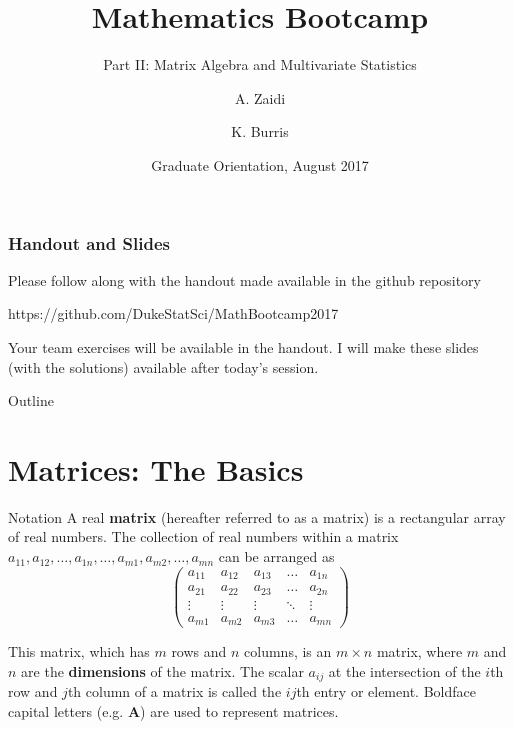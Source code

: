 \documentclass{beamer}
\title{Mathematics Bootcamp}
\subtitle{Part II: Matrix Algebra and Multivariate Statistics}
\author{A. Zaidi\inst{1} \and K. Burris\inst{1}}
\institute[Duke University] %
{
  \inst{1}%
  Department of Statistical Science\\
  Duke University
  }
\date{Graduate Orientation, August 2017}
\begin{document}
\begin{frame}
  \titlepage
\end{frame}

\begin{frame}
\frametitle{Handout and Slides}

Please follow along with the handout made available in the github repository

\begin{center}
https://github.com/DukeStatSci/MathBootcamp2017
\end{center} 

Your team exercises will be available in the handout.  I will make these slides (with the solutions) available after today's session.
\end{frame}

\begin{frame}{Outline}
  \tableofcontents
\end{frame}

\section{Matrices: The Basics}
\begin{frame}{Notation}
A real \textbf{matrix} (hereafter referred to as a matrix) is a rectangular array of real numbers.  The collection of real numbers within a matrix $a_{11}, a_{12}, \hdots, a_{1n}, \hdots, a_{m1}, a_{m2}, \hdots, a_{mn}$ can be arranged as
\[
\begin{pmatrix}
    a_{11} & a_{12} & a_{13} & \dots  & a_{1n} \\
    a_{21} & a_{22} & a_{23} & \dots  & a_{2n} \\
    \vdots & \vdots & \vdots & \ddots & \vdots \\
    a_{m1} & a_{m2} & a_{m3} & \dots  & a_{mn}
\end{pmatrix}
\]

This matrix, which has $m$ rows and $n$ columns, is an $m \times n$ matrix, where $m$ and $n$ are the \textbf{dimensions} of the matrix.  The scalar $a_{ij}$ at the intersection of the $i$th row and $j$th column of a matrix is called the $ij$th entry or element.  Boldface capital letters (e.g. $\mathbf{A}$) are used to represent matrices. \\
\end{frame}
\end{document}
